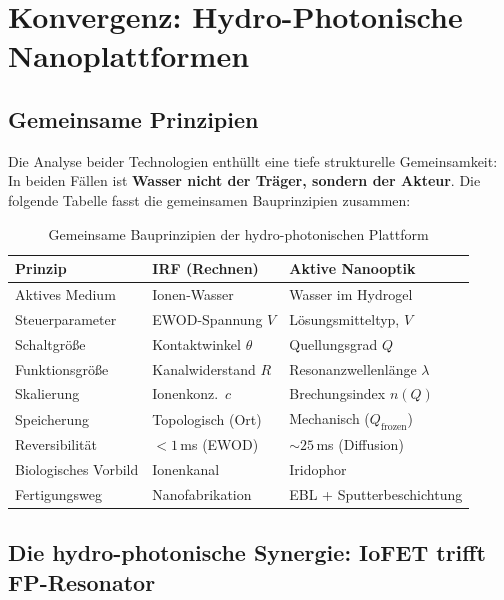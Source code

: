 ﻿\documentclass[a4paper,12pt]{scrreprt}
\theoremstyle{definition}
\begin{document}
\section{Konvergenz: Hydro-Photonische Nanoplattformen}

\subsection{Gemeinsame Prinzipien}

Die Analyse beider Technologien enthüllt eine tiefe strukturelle Gemeinsamkeit:
In beiden Fällen ist \textbf{Wasser nicht der Träger, sondern der Akteur}.
Die folgende Tabelle fasst die gemeinsamen Bauprinzipien zusammen:

\begin{table}[H]
  \centering
  \caption{Gemeinsame Bauprinzipien der hydro-photonischen Plattform}
  \label{tab:gemeinsam}
  \begin{tabular}{p{3.5cm}p{4.5cm}p{4.5cm}}
    \toprule
    \textbf{Prinzip} & \textbf{IRF (Rechnen)} & \textbf{Aktive Nanooptik} \\
    \midrule
    Aktives Medium    & Ionen-Wasser           & Wasser im Hydrogel \\
    Steuerparameter   & EWOD-Spannung $V$      & Lösungsmitteltyp, $V$ \\
    Schaltgröße       & Kontaktwinkel $\theta$ & Quellungsgrad $Q$ \\
    Funktionsgröße    & Kanalwiderstand $R$    & Resonanzwellenlänge $\lambda$ \\
    Skalierung        & Ionenkonz.\ $c$        & Brechungsindex $n(Q)$ \\
    Speicherung       & Topologisch (Ort)      & Mechanisch ($Q_\mathrm{frozen}$) \\
    Reversibilität    & $< 1$\,ms (EWOD)       & $\sim 25$\,ms (Diffusion) \\
    Biologisches Vorbild & Ionenkanal          & Iridophor \\
    Fertigungsweg     & Nanofabrikation        & EBL + Sputterbeschichtung \\
    \bottomrule
  \end{tabular}
\end{table}

\subsection{Die hydro-photonische Synergie: IoFET trifft FP-Resonator}
\end{document}
